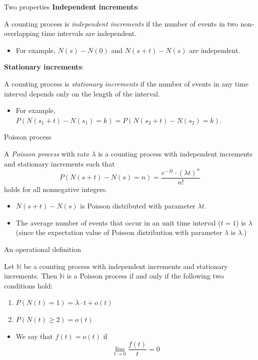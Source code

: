 \documentclass[mathserif]{beamer}
\begin{document}
\begin{frame}{Two properties}
\textbf{Independent increments}:
\begin{definition}
A counting process is \emph{independent increments} if the number of events in two non-overlapping time intervals are independent.
\end{definition}
\begin{itemize}
\item For example, $N(s) - N(0)$ and $N(s+t) - N(s)$ are independent.
\end{itemize}
\textbf{Stationary increments}:
\begin{definition}
A counting process is \emph{stationary increments} if the number of events in any time interval depends only on the  length of the interval.
\end{definition}
\begin{itemize}
\item For example, $P(N(s_1 + t) - N(s_1) = k) = P(N(s_2 + t) - N(s_2) = k)$.
\end{itemize}
\end{frame}

\begin{frame}{Poisson process}
\begin{definition}
A \emph{Poisson process} with rate $\lambda$ is a counting process with independent increments and stationary increments such that
\[
P(N(s+t)-N(s) = n) = \frac{e^{-\lambda t}\cdot (\lambda t)^n}{n!}
\]
holds for all nonnegative integers.
\end{definition}
\begin{itemize}
\item $N(s+t)-N(s)$ is Poisson distributed with parameter $\lambda t$.
\item The average number of events that occur in an unit time interval ($t=1$) is $\lambda$ (since the expectation value of Poisson distribution with parameter $\lambda$ is $\lambda$.)
\end{itemize}
\end{frame}

\begin{frame}{An operational definition}\label{operation_def}
\begin{theorem}
Let $\mathbb{N}$ be a counting process with independent increments and stationary increments.
Then $\mathbb{N}$ is a Poisson process if and only if the following two conditions hold:
\begin{enumerate}
\item $P(N(t)=1) = \lambda\cdot t + o(t)$
\item $P(N(t)\geq 2) = o(t)$
\end{enumerate}
\end{theorem}
\begin{itemize}
\item We say that $f(t)=o(t)$ if
\[
\lim_{t\to 0} \frac{f(t)}{t} = 0
\]
\end{itemize}
\end{frame}
\end{document}
